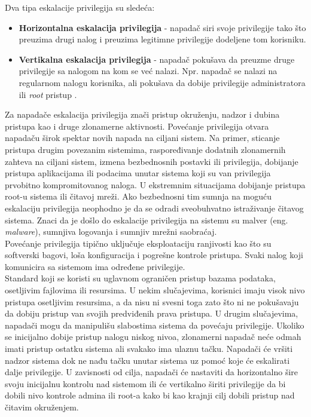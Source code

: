 \documentclass[a4paper,12pt]{article}
\begin{document}
Dva tipa eskalacije privilegija su sledeća:

\begin{itemize}
  \item \textbf{Horizontalna eskalacija privilegija} - napadač siri svoje privilegije tako što preuzima drugi nalog i preuzima legitimne privilegije dodeljene tom korisniku.
    \item \textbf{Vertikalna eskalacija privilegija} - napadač pokušava da preuzme druge privilegije sa nalogom na kom se već nalazi. Npr. napadač se nalazi na regularnom nalogu korisnika, ali pokušava da dobije privilegije administratora ili \textit{root} pristup \cite{privilege-escalation}.
\end{itemize}

Za napadače eskalacija privilegija znači pristup okruženju, nadzor i dubina pristupa kao i druge zlonamerne aktivnosti. Povećanje privilegija otvara napadaču širok spektar novih napada na ciljani sistem. Na primer, sticanje pristupa drugim povezanim sistemima, raspoređivanje dodatnih zlonamernih zahteva na ciljani sistem, izmena bezbednosnih postavki ili privilegija, dobijanje pristupa aplikacijama ili podacima unutar sistema koji su van privilegija prvobitno kompromitovanog naloga. U ekstremnim situacijama dobijanje pristupa root-u sistema ili čitavoj mreži. Ako bezbednosni tim sumnja na moguću eskalaciju privilegija neophodno je da se odradi sveobuhvatno istraživanje čitavog sistema. Znaci da je došlo do eskalacije privilegija na sistemu su malver (eng. \textit{malware}), sumnjiva logovanja i sumnjiv mrežni saobraćaj. \\



Povećanje privilegija tipično uključuje eksploataciju ranjivosti kao što su softverski bagovi, loša konfiguracija i pogrešne kontrole pristupa. Svaki nalog koji komunicira sa sistemom ima određene privilegije.\\ Standard koji se koristi su uglavnom ograničen pristup bazama podataka, osetljivim fajlovima ili resursima. U nekim slučajevima, korisnici imaju visok nivo pristupa osetljivim resursima, a da nisu ni svesni toga zato što ni ne pokušavaju da dobiju pristup van svojih predviđenih prava pristupa. U drugim slučajevima, napadači mogu da manipulišu slabostima sistema da povećaju privilegije. Ukoliko se inicijalno dobije pristup nalogu niskog nivoa, zlonamerni napadač neće odmah imati pristup ostatku sistema ali svakako ima ulaznu tačku. Napadači će vršiti nadzor sistema dok ne nađu tačku unutar sistema uz pomoć koje će eskalirati dalje privilegije. U zavisnosti od cilja, napadači će nastaviti da horizontalno šire svoju inicijalnu kontrolu nad sistemom ili će vertikalno širiti privilegije da bi dobili nivo kontrole admina ili root-a kako bi kao krajnji cilj dobili pristup nad čitavim okruženjem.
\cite{privilege-escalation-2}
\end{document}

